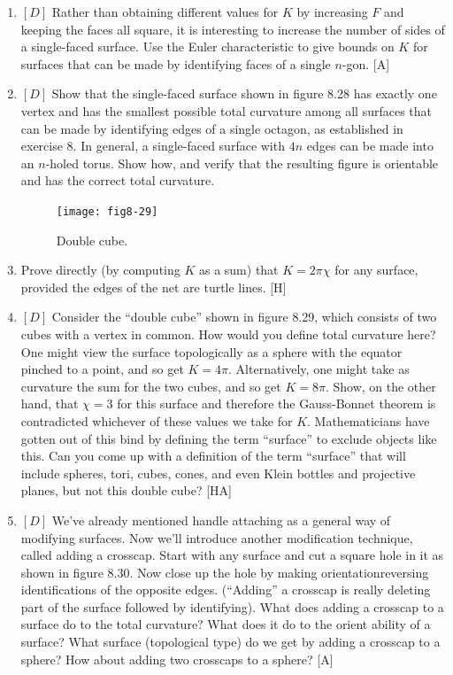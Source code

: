 \documentclass{book}
\begin{document}
\begin{enumerate}
\item $[D]$ Rather than obtaining different values for $K$ by increasing $F$
and keeping the faces all square, it is interesting to increase the number
of sides of a single-faced surface. Use the Euler characteristic to give
bounds on $K$ for surfaces that can be made by identifying faces of a
single $n$-gon. [A]

\item $[D]$ Show that the single-faced surface shown in figure 8.28 has
exactly one vertex and has the smallest possible total curvature among
all surfaces that can be made by identifying edges of a single octagon,
as established in exercise 8. In general, a single-faced surface with $4n$
edges can be made into an $n$-holed torus. Show how, and verify that
the resulting figure is orientable and has the correct total curvature.

\begin{figure}
\begin{center}
\texttt{[image: fig8-29]}
\caption{Double cube.}
\end{center}
\end{figure}

\item Prove directly (by computing $K$ as a sum) that $K = 2 \pi \chi $ for any
surface, provided the edges of the net are turtle lines. [H]

\item $[D]$ Consider the ``double cube'' shown in figure 8.29, which consists
of two cubes with a vertex in common. How would you define total
curvature here? One might view the surface topologically as a sphere
with the equator pinched to a point, and so get $K = 4 \pi$. Alternatively,
one might take as curvature the sum for the two cubes, and so get $K = 8 \pi $.
Show, on the other hand, that $\chi = 3$ for this surface and therefore
the Gauss-Bonnet theorem is contradicted whichever of these values we
take for $K$. Mathematicians have gotten out of this bind by defining
the term ``surface'' to exclude objects like this. Can you come up with
a definition of the term ``surface'' that will include spheres, tori, cubes,
cones, and even Klein bottles and projective planes, but not this double
cube? [HA]

\item $[D]$ We've already mentioned handle attaching as a general way of
modifying surfaces. Now we'll introduce another modification technique,
called adding a crosscap. Start with any surface and cut a square hole in
it as shown in figure 8.30. Now close up the hole by making orientationreversing identifications of the opposite edges. (``Adding'' a crosscap is
really deleting part of the surface followed by identifying). What does
adding a crosscap to a surface do to the total curvature? What does
it do to the orient ability of a surface? What surface (topological type)
do we get by adding a crosscap to a sphere? How about adding two
crosscaps to a sphere? [A]


\end{enumerate}
\end{document}
